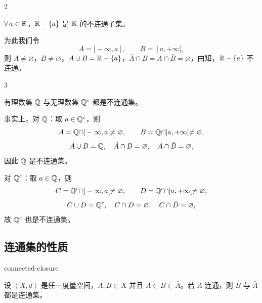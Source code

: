 \begin{sourceexample}{2}

$\forall\,a\in\mathbb{R}$，$\mathbb{R}-\{a\}$ 是 $\mathbb{R}$ 的不连通子集。

为此我们令
\[A=]-\infty,a[,\qquad B=]a,+\infty[,\]
则 $A\neq\varnothing$，$B\neq\varnothing$，$A\cup B=\mathbb{R}-\{a\}$，$\bar{A}\cap B=A\cap\bar{B}=\varnothing$，由知，$\mathbb{R}-\{a\}$ 不连通。

\end{sourceexample}

\begin{sourceexample}{3}

有理数集 $\mathbb{Q}$ 与无理数集 $\mathbb{Q}^c$ 都是不连通集。

事实上，对 $\mathbb{Q}$：取 $a\in\mathbb{Q}^c$，则
\[A=\mathbb{Q}\cap]-\infty,a[\neq\varnothing,\qquad B=\mathbb{Q}\cap]a,+\infty[\neq\varnothing,\]
\[A\cup B=\mathbb{Q},\quad \bar{A}\cap B=\varnothing,\quad A\cap\bar{B}=\varnothing,\]
因此 $\mathbb{Q}$ 是不连通集。

对 $\mathbb{Q}^c$：取 $a\in\mathbb{Q}$，则
\[C=\mathbb{Q}^c\cap]-\infty,a[\neq\varnothing,\qquad D=\mathbb{Q}^c\cap]a,+\infty[\neq\varnothing,\]
\[C\cup D=\mathbb{Q}^c,\quad C\cap D=\varnothing,\quad C\cap\bar{D}=\varnothing,\]
故 $\mathbb{Q}^c$ 也是不连通集。

\end{sourceexample}

\subsection{连通集的性质}

\begin{mythm}{}{connected-closure}

设 $(X,d)$ 是任一度量空间，$A,B\subset X$ 并且 $A\subset B\subset\bar{A}$。若 $A$ 连通，则 $B$ 与 $\bar{A}$ 都是连通集。

\end{mythm}


